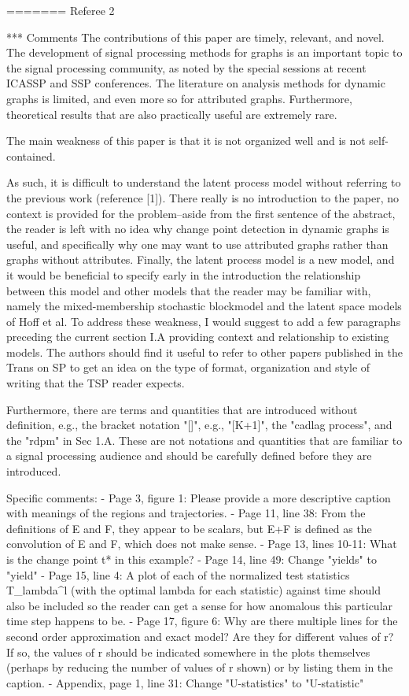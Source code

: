 =======
Referee 2

*** Comments
The contributions of this paper are timely, relevant, and novel. The
development of signal processing methods for graphs is an important
topic to the signal processing community, as noted by the special
sessions at recent ICASSP and SSP conferences. The literature on
analysis methods for dynamic graphs is limited, and even more so for
attributed graphs. Furthermore, theoretical results that are also
practically useful are extremely rare.

The main weakness of this paper is that it is not organized well and
is not self-contained.

As such, it is difficult to understand the latent process model
without referring to the previous work (reference [1]). There really
is no introduction to the paper, no context is provided for the
problem--aside from the first sentence of the abstract, the reader is
left with no idea why change point detection in dynamic graphs is
useful, and specifically why one may want to use attributed graphs
rather than graphs without attributes. Finally, the latent process
model is a new model, and it would be beneficial to specify early in
the introduction the relationship between this model and other models
that the reader may be familiar with, namely the mixed-membership
stochastic blockmodel and the latent space models of Hoff et al. To
address these weakness, I would suggest to add a few paragraphs
preceding the current section I.A providing context and relationship
to existing models. The authors should find it useful to refer to
other papers published in the Trans on SP to get an idea on the type
of format, organization and style of writing that the TSP reader
expects.

Furthermore, there are terms and quantities that are introduced
without definition, e.g., the bracket notation "[]", e.g., "[K+1]",
the "cadlag process", and the "rdpm" in Sec 1.A. These are not
notations and quantities that are familiar to a signal processing
audience and should be carefully defined before they are introduced.

Specific comments:
- Page 3, figure 1: Please provide a more descriptive caption with
meanings of the regions and trajectories.
- Page 11, line 38: From the definitions of E and F, they appear to be
scalars, but E+F is defined as the convolution of E and F, which does
not make sense.
- Page 13, lines 10-11: What is the change point t* in this example?
- Page 14, line 49: Change "yields" to "yield"
- Page 15, line 4: A plot of each of the normalized test statistics
T_lambda^l (with the optimal lambda for each statistic) against time
should also be included so the reader can get a sense for how
anomalous this particular time step happens to be.
- Page 17, figure 6: Why are there multiple lines for the second order
approximation and exact model? Are they for different values of r? If
so, the values of r should be indicated somewhere in the plots
themselves (perhaps by reducing the number of values of r shown) or by
listing them in the caption.
- Appendix, page 1, line 31: Change "U-statistics" to "U-statistic"

